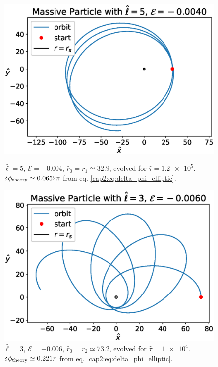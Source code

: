 \begin{figure}[h]
    \begin{minipage}{0.48 \textwidth}
        \centering
        \includegraphics[width=\textwidth]{Figures/chapter2/prec1.eps}
        \caption{$\hat \ell = 5$, $\mathcal E = -0.004$,
        $\hat r_0 = r_1 \simeq 32.9$, evolved for $\hat \tau = \num{1.2e5}$. \\
        $\delta \phi_{\rm theory} \simeq 0.0652 \pi$ from eq.
        \ref{cap2:eq:delta_phi_elliptic}.}
        \label{cap2:fig:prec1}
    \end{minipage}
    \hspace{0.015 \textwidth}
    \begin{minipage}{0.48 \textwidth}
        \centering
        \includegraphics[width=\textwidth]{Figures/chapter2/prec2.eps}
        \caption{$\hat \ell = 3$, $\mathcal E = -0.006$,
        $\hat r_0 = r_2 \simeq 73.2$, evolved for $\hat \tau = \num{1e4}$. \\
        $\delta \phi_{\rm theory} \simeq 0.221 \pi$ from eq.
        \ref{cap2:eq:delta_phi_elliptic}.}
        \label{cap2:fig:prec2}
    \end{minipage}
\end{figure}

